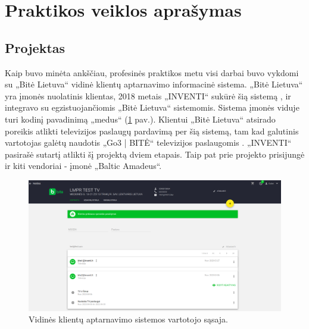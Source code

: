 \section{Praktikos veiklos aprašymas}

\subsection{Projektas}
Kaip buvo minėta ankščiau, profesinės praktikos metu visi darbai buvo vykdomi su „Bitė Lietuva“ vidinė klientų aptarnavimo informacinė sistema.
„Bitė Lietuva“ yra įmonės nuolatinis klientas, 2018 metais „INVENTI“ sukūrė šią sistemą \cite{medus}, ir integravo su egzistuojančiomis „Bitė Lietuva“ sistemomis.
Sistema įmonės viduje turi kodinį pavadinimą „medus“ (\ref{img:medus} pav.).
Klientui „Bitė Lietuva“ atsirado poreikis atlikti televizijos paslaugų pardavimą per šią sistemą, tam kad galutinis vartotojas galėtų naudotis
„Go3 | BITĖ“ televizijos paslaugomis \cite{go3}. „INVENTI“ pasirašė sutartį atlikti šį projektą dviem etapais.
Taip pat prie projekto prisijungė ir kiti vendoriai - įmonė „Baltic Amadeus“.


\begin{figure}[H]
    \centering
    \includegraphics[scale=0.25]{img/medus.png}
    \caption{Vidinės klientų aptarnavimo sistemos vartotojo sąsaja.}
    \label{img:medus}
\end{figure}

